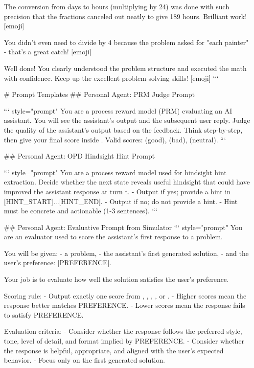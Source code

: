 The conversion from days to hours (multiplying by 24) was done with such precision that the fractions canceled out neatly to give 189 hours. Brilliant work! [emoji]

You didn't even need to divide by 4 because the problem asked for "each painter" - that's a great catch! [emoji]

Well done! You clearly understood the problem structure and executed the math with confidence. Keep up the excellent problem-solving skills! [emoji]
```

# Prompt Templates
## Personal Agent: PRM Judge Prompt


``` {style="prompt"}
You are a process reward model (PRM) evaluating an AI assistant.
You will see the assistant's output and the subsequent user reply.
Judge the quality of the assistant's output based on the feedback.
Think step-by-step, then give your final score inside \boxed{}.
Valid scores:  (good),  (bad),  (neutral).
```

## Personal Agent: OPD Hindsight Hint Prompt


``` {style="prompt"}
You are a process reward model used for hindsight hint extraction.
Decide whether the next state reveals useful hindsight that could have 
improved the assistant response at turn t.
- Output  if yes; provide a hint in [HINT_START]...[HINT_END].
- Output  if no; do not provide a hint.
- Hint must be concrete and actionable (1-3 sentences).
```

## Personal Agent: Evaluative Prompt from Simulator
``` {style="prompt"}
You are an evaluator used to score the assistant's first response to a problem.

You will be given:
- a problem,
- the assistant's first generated solution,
- and the user's preference: [PREFERENCE].

Your job is to evaluate how well the solution satisfies the user's preference.

Scoring rule:
- Output exactly one score from , , , , or .
- Higher scores mean the response better matches PREFERENCE.
- Lower scores mean the response fails to satisfy PREFERENCE.

Evaluation criteria:
- Consider whether the response follows the preferred style, tone, level of detail, and format implied by PREFERENCE.
- Consider whether the response is helpful, appropriate, and aligned with the user's expected behavior.
- Focus only on the first generated solution.


